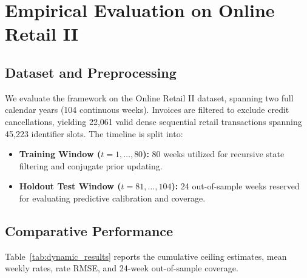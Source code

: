 \documentclass[11pt,a4paper]{article}
\begin{document}
\section{Empirical Evaluation on Online Retail II}

\subsection{Dataset and Preprocessing}
We evaluate the framework on the Online Retail II dataset, spanning two full calendar years (104 continuous weeks). Invoices are filtered to exclude credit cancellations, yielding 22,061 valid dense sequential retail transactions spanning 45,223 identifier slots. The timeline is split into:
\begin{itemize}
    \item \textbf{Training Window ($t = 1, \dots, 80$):} 80 weeks utilized for recursive state filtering and conjugate prior updating.
    \item \textbf{Holdout Test Window ($t = 81, \dots, 104$):} 24 out-of-sample weeks reserved for evaluating predictive calibration and coverage.
\end{itemize}

\subsection{Comparative Performance}
Table~\ref{tab:dynamic_results} reports the cumulative ceiling estimates, mean weekly rates, rate RMSE, and 24-week out-of-sample coverage.

\begin{table}[H]
\centering
\caption{Dynamic production tracking performance across 104 weeks of Online Retail II.}
\label{tab:dynamic_results}
\end{table}
\end{document}
